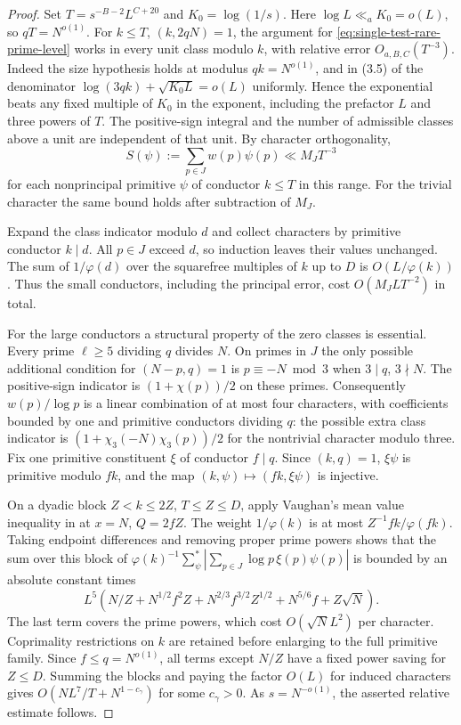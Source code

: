 \documentclass[11pt,a4paper]{article}
\numberwithin{equation}{section}
\begin{document}
\begin{proof}
Set $T=s^{-B-2}L^{C+20}$ and $K_0=\log(1/s)$.
Here $\log L\ll_a K_0=o(L)$, so $qT=N^{o(1)}$.
For $k\le T$, $(k,2qN)=1$, the argument for
\eqref{eq:single-test-rare-prime-level} works in every unit
class modulo $k$, with relative error $O_{a,B,C}(T^{-3})$.
Indeed the size hypothesis holds at modulus $qk=N^{o(1)}$,
and in (3.5) of \cite{ThornerZamanAP} the denominator
$\log(3qk)+\sqrt{K_0L}=o(L)$ uniformly. Hence the exponential
beats any fixed multiple of $K_0$ in the exponent, including
the prefactor $L$ and three powers of $T$. The positive-sign
integral and the number of admissible classes above a unit
are independent of that unit. By character orthogonality,
\[
 S(\psi):=\sum_{p\in J} w(p)\psi(p)
 \ll M_J T^{-3}
\]
for each nonprincipal primitive $\psi$ of conductor $k\le T$
in this range. For the trivial character the same bound holds
after subtraction of $M_J$.

Expand the class indicator modulo $d$ and collect characters by
primitive conductor $k\mid d$. All $p\in J$ exceed $d$, so
induction leaves their values unchanged. The sum of $1/\varphi(d)$
over the squarefree multiples of $k$ up to $D$ is
$O(L/\varphi(k))$. Thus the small conductors, including the
principal error, cost $O(M_J L T^{-2})$ in total.

For the large conductors a structural property of the zero classes
is essential. Every prime $\ell\ge5$ dividing $q$ divides $N$.
On primes in $J$ the only possible additional condition for
$(N-p,q)=1$ is $p\equiv -N\bmod 3$ when $3\mid q$, $3\nmid N$.
The positive-sign indicator is $(1+\chi(p))/2$ on these primes.
Consequently $w(p)/\log p$ is a linear combination of at most
four characters, with coefficients bounded by one and primitive
conductors dividing $q$: the possible extra class indicator is
$(1+\chi_3(-N)\chi_3(p))/2$ for the nontrivial character modulo
three. Fix one primitive constituent $\xi$ of conductor $f\mid q$.
Since $(k,q)=1$, $\xi\psi$ is primitive modulo $fk$, and the
map $(k,\psi)\mapsto(fk,\xi\psi)$ is injective.

On a dyadic block $Z<k\le 2Z$, $T\le Z\le D$, apply Vaughan's
mean value inequality in \cite[Theorem~1.2]{AkbaryHambrook}
at $x=N$, $Q=2fZ$. The weight $1/\varphi(k)$ is at most
$Z^{-1}fk/\varphi(fk)$. Taking endpoint differences and removing
proper prime powers shows that the sum over this block of
$\varphi(k)^{-1}\sum_\psi^*|\sum_{p\in J}\log p\,\xi(p)\psi(p)|$
is bounded by an absolute constant times
\[
 L^5\left(N/Z+N^{1/2}f^2Z
        +N^{2/3}f^{3/2}Z^{1/2}+N^{5/6}f+Z\sqrt N\right).
\]
The last term covers the prime powers, which cost
$O(\sqrt N L^2)$ per character. Coprimality restrictions on
$k$ are retained before enlarging to the full primitive family.
Since $f\le q=N^{o(1)}$, all terms except $N/Z$ have a fixed
power saving for $Z\le D$. Summing the blocks and paying the
factor $O(L)$ for induced characters gives
$O(N L^7/T+N^{1-c_\gamma})$ for some $c_\gamma>0$.
As $s=N^{-o(1)}$, the asserted relative estimate follows.
\end{proof}
\end{document}
